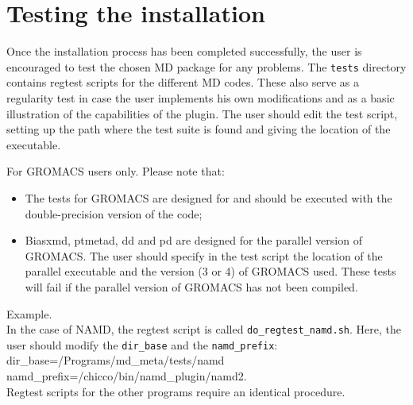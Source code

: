 \documentclass[12pt,fleqn]{report}
\newcommand{\esempio}[1]{
\vspace{10pt}
\begin{flushright}
\colorbox{light-gray}{
   \begin{minipage}{13cm}
       \scriptsize{
{\fontfamily{phv} \fontseries{b}
 \selectfont Example. \\
 \fontseries{m} \selectfont #1 } }
\end{minipage}}
\end{flushright}
\vspace{20pt}
}
\begin{document}
%


\section{Testing the installation}
\label{sec.regtest}

Once the installation process has been completed successfully, 
the user is encouraged to test  the chosen MD package for any problems.
The {\tt tests} directory contains regtest scripts for the different MD codes.
These also serve as a regularity test in case the user implements his own modifications and 
as a basic illustration of the capabilities  of the plugin.
The user should edit the test script,
setting up the path where the test suite is found and giving the location of the executable.

For GROMACS users only. Please note that:
\begin{itemize}
\item The tests for GROMACS are designed for and should be executed with the
double-precision version of the code;
\item Biasxmd, ptmetad, dd and pd are designed for the parallel version of GROMACS.
The user should specify in the test script the location of the parallel executable and the version
(3 or 4) of GROMACS used. These tests will fail if the parallel version of
    GROMACS has not been compiled. 
\end{itemize}

\esempio{In the case of NAMD, the regtest script is called 
{\tt  do\_regtest\_namd.sh}. Here, the user should modify the {\tt dir\_base} and the {\tt \tt namd\_prefix}: \vspace{10pt} \\
dir\_base=/Programs/md\_meta/tests/namd \\
 namd\_prefix=/chicco/bin/namd\_plugin/namd2. \\

Regtest scripts for the other programs require an identical procedure.

}
\end{document}
